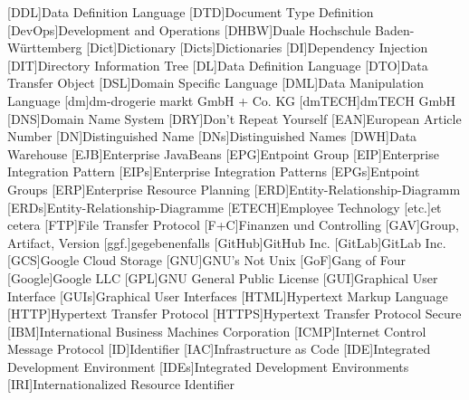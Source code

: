 \begin{acronym}[]
        [DDL]{Data Definition Language}
        [DTD]{Document Type Definition}
        [DevOps]{Development and Operations}
        [DHBW]{Duale Hochschule Baden-Württemberg}
        [Dict]{Dictionary}
        [Dicts]{Dictionaries}
        [DI]{Dependency Injection}
        [DIT]{Directory Information Tree}
        [DL]{Data Definition Language}
        [DTO]{Data Transfer Object}
        [DSL]{Domain Specific Language}
        [DML]{Data Manipulation Language}
        [dm]{dm-drogerie markt GmbH + Co. KG}
        [dmTECH]{dmTECH GmbH}
        [DNS]{Domain Name System}
        [DRY]{Don't Repeat Yourself}
        [EAN]{European Article Number}
        [DN]{Distinguished Name}
        [DNs]{Distinguished Names}
        [DWH]{Data Warehouse}
        [EJB]{Enterprise JavaBeans}
        [EPG]{Entpoint Group}
        [EIP]{Enterprise Integration Pattern}
        [EIPs]{Enterprise Integration Patterns}
        [EPGs]{Entpoint Groups}
        [ERP]{Enterprise Resource Planning}
        [ERD]{Entity-Relationship-Diagramm}
        [ERDs]{Entity-Relationship-Diagramme}
        [ETECH]{Employee Technology}
        [etc.]{et cetera}
        [FTP]{File Transfer Protocol}
        [F+C]{Finanzen und Controlling}
        [GAV]{Group, Artifact, Version}
        [ggf.]{gegebenenfalls}
        [GitHub]{GitHub Inc.}
        [GitLab]{GitLab Inc.}
        [GCS]{Google Cloud Storage}
        [GNU]{GNU's Not Unix}
        [GoF]{Gang of Four}
        [Google]{Google LLC}
        [GPL]{GNU General Public License}
        [GUI]{Graphical User Interface}
        [GUIs]{Graphical User Interfaces}
        [HTML]{Hypertext Markup Language}
        [HTTP]{Hypertext Transfer Protocol}
        [HTTPS]{Hypertext Transfer Protocol Secure}
        [IBM]{International Business Machines Corporation}
        [ICMP]{Internet Control Message Protocol}
        [ID]{Identifier}
        [IAC]{Infrastructure as Code}
        [IDE]{Integrated Development Environment}
        [IDEs]{Integrated Development Environments}
        [IRI]{Internationalized Resource Identifier}

\end{acronym}
